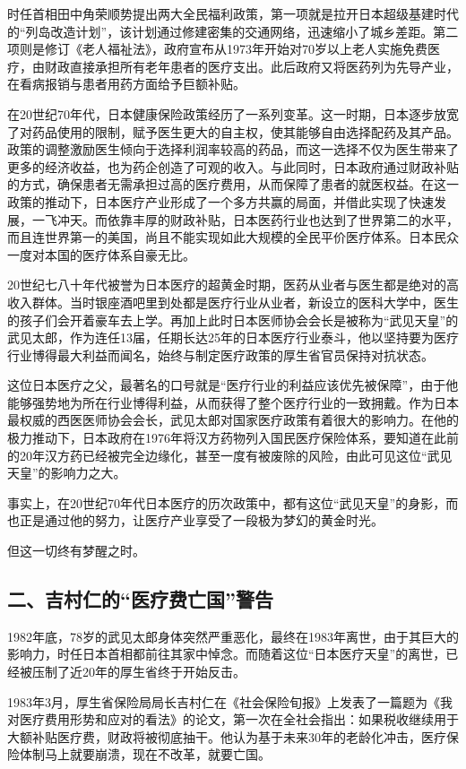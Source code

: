 时任首相田中角荣顺势提出两大全民福利政策，第一项就是拉开日本超级基建时代的“列岛改造计划”，该计划通过修建密集的交通网络，迅速缩小了城乡差距。第二项则是修订《老人福祉法》，政府宣布从1973年开始对70岁以上老人实施免费医疗，由财政直接承担所有老年患者的医疗支出。此后政府又将医药列为先导产业，在看病报销与患者用药方面给予巨额补贴。

在20世纪70年代，日本健康保险政策经历了一系列变革。这一时期，日本逐步放宽了对药品使用的限制，赋予医生更大的自主权，使其能够自由选择配药及其产品。政策的调整激励医生倾向于选择利润率较高的药品，而这一选择不仅为医生带来了更多的经济收益，也为药企创造了可观的收入。与此同时，日本政府通过财政补贴的方式，确保患者无需承担过高的医疗费用，从而保障了患者的就医权益。在这一政策的推动下，日本医疗产业形成了一个多方共赢的局面，并借此实现了快速发展，一飞冲天。而依靠丰厚的财政补贴，日本医药行业也达到了世界第二的水平，而且连世界第一的美国，尚且不能实现如此大规模的全民平价医疗体系。日本民众一度对本国的医疗体系自豪无比。

20世纪七八十年代被誉为日本医疗的超黄金时期，医药从业者与医生都是绝对的高收入群体。当时银座酒吧里到处都是医疗行业从业者，新设立的医科大学中，医生的孩子们会开着豪车去上学。再加上此时日本医师协会会长是被称为“武见天皇”的武见太郎，作为连任13届，任期长达25年的日本医疗行业泰斗，他以坚持要为医疗行业博得最大利益而闻名，始终与制定医疗政策的厚生省官员保持对抗状态。

这位日本医疗之父，最著名的口号就是“医疗行业的利益应该优先被保障”，由于他能够强势地为所在行业博得利益，从而获得了整个医疗行业的一致拥戴。作为日本最权威的西医医师协会会长，武见太郎对国家医疗政策有着很大的影响力。在他的极力推动下，日本政府在1976年将汉方药物列入国民医疗保险体系，要知道在此前的20年汉方药已经被完全边缘化，甚至一度有被废除的风险，由此可见这位“武见天皇”的影响力之大。

事实上，在20世纪70年代日本医疗的历次政策中，都有这位“武见天皇”的身影，而也正是通过他的努力，让医疗产业享受了一段极为梦幻的黄金时光。

但这一切终有梦醒之时。

\subsection{二、吉村仁的“医疗费亡国”警告}

1982年底，78岁的武见太郎身体突然严重恶化，最终在1983年离世，由于其巨大的影响力，时任日本首相都前往其家中悼念。而随着这位“日本医疗天皇”的离世，已经被压制了近20年的厚生省终于开始反击。

1983年3月，厚生省保险局局长吉村仁在《社会保险旬报》上发表了一篇题为《我对医疗费用形势和应对的看法》的论文，第一次在全社会指出：如果税收继续用于大额补贴医疗费，财政将被彻底抽干。他认为基于未来30年的老龄化冲击，医疗保险体制马上就要崩溃，现在不改革，就要亡国。

